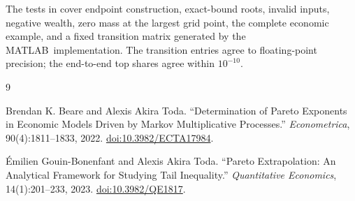 \documentclass[a4paper,11pt]{article}
\newcommand{\matlab}{\textsf{MATLAB}}
\newcommand{\file}[1]{\texttt{\detokenize{#1}}}
\begin{document}
The tests in \file{python/tests} cover endpoint construction, exact-bound
roots, invalid inputs, negative wealth, zero mass at the largest grid point,
the complete economic example, and a fixed transition matrix generated by the
\matlab\ implementation.  The transition entries agree to floating-point
precision; the end-to-end top shares agree within $10^{-10}$.

\begin{thebibliography}{9}
\small
\raggedright

Brendan K. Beare and Alexis Akira Toda.
``Determination of Pareto Exponents in Economic Models Driven by Markov
Multiplicative Processes.''
\emph{Econometrica}, 90(4):1811--1833, 2022.
\href{https://doi.org/10.3982/ECTA17984}{doi:10.3982/ECTA17984}.

{\'E}milien Gouin-Bonenfant and Alexis Akira Toda.
``Pareto Extrapolation: An Analytical Framework for Studying Tail Inequality.''
\emph{Quantitative Economics}, 14(1):201--233, 2023.
\href{https://doi.org/10.3982/QE1817}{doi:10.3982/QE1817}.

\end{thebibliography}
\end{document}
